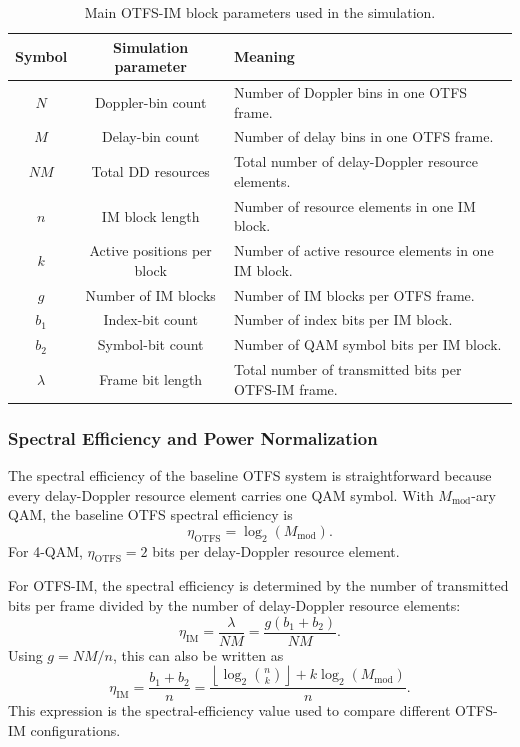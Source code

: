 \begin{table}[H]
\centering
\caption{Main OTFS-IM block parameters used in the simulation.}
\label{tab:otfs_im_parameters}
\begin{tabularx}{0.95\linewidth}{|c|c|X|}
\hline
\textbf{Symbol} & \textbf{Simulation parameter} & \textbf{Meaning} \\
\hline
\(N\) & Doppler-bin count & Number of Doppler bins in one OTFS frame. \\
\hline
\(M\) & Delay-bin count & Number of delay bins in one OTFS frame. \\
\hline
\(NM\) & Total DD resources & Total number of delay-Doppler resource elements. \\
\hline
\(n\) & IM block length & Number of resource elements in one IM block. \\
\hline
\(k\) & Active positions per block & Number of active resource elements in one IM block. \\
\hline
\(g\) & Number of IM blocks & Number of IM blocks per OTFS frame. \\
\hline
\(b_1\) & Index-bit count & Number of index bits per IM block. \\
\hline
\(b_2\) & Symbol-bit count & Number of QAM symbol bits per IM block. \\
\hline
\(\lambda\) & Frame bit length & Total number of transmitted bits per OTFS-IM frame. \\
\hline
\end{tabularx}
\end{table}

\subsubsection{Spectral Efficiency and Power Normalization}

The spectral efficiency of the baseline OTFS system is straightforward because every delay-Doppler resource element carries one QAM symbol. With \(M_{\mathrm{mod}}\)-ary QAM, the baseline OTFS spectral efficiency is
\begin{equation}
    \eta_{\mathrm{OTFS}} = \log_2(M_{\mathrm{mod}}).
    \label{eq:otfs_baseline_se}
\end{equation}
For 4-QAM, \(\eta_{\mathrm{OTFS}} = 2\) bits per delay-Doppler resource element.

For OTFS-IM, the spectral efficiency is determined by the number of transmitted bits per frame divided by the number of delay-Doppler resource elements:
\begin{equation}
    \eta_{\mathrm{IM}}
    =
    \frac{\lambda}{NM}
    =
    \frac{g(b_1+b_2)}{NM}.
    \label{eq:otfs_im_se_frame}
\end{equation}
Using \(g = NM/n\), this can also be written as
\begin{equation}
    \eta_{\mathrm{IM}}
    =
    \frac{b_1+b_2}{n}
    =
    \frac{
    \left\lfloor \log_2 \binom{n}{k} \right\rfloor
    +
    k\log_2(M_{\mathrm{mod}})
    }{n}.
    \label{eq:otfs_im_se_block}
\end{equation}
This expression is the spectral-efficiency value used to compare different OTFS-IM configurations.

